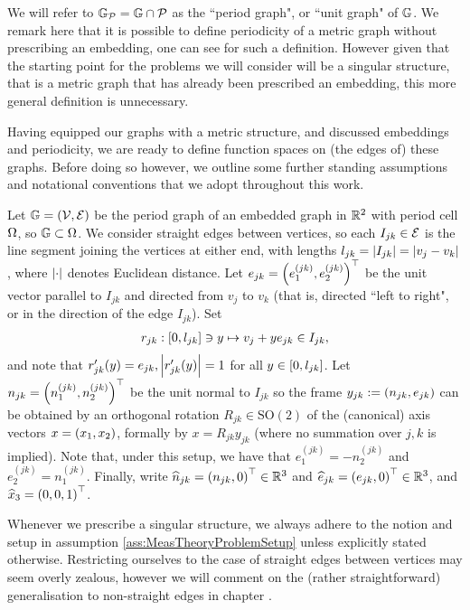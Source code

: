 We will refer to $\mathbb{G}_{\mathcal{P}} = \mathbb{G} \cap \mathcal{P}$ as the ``period graph", or ``unit graph" of $\mathbb{G}$.
We remark here that it is possible to define periodicity of a metric graph without prescribing an embedding, one can see \cite[Chapter~4]{berkolaiko2013introduction} for such a definition.
However given that the starting point for the problems we will consider will be a singular structure, that is a metric graph that has already been prescribed an embedding, this more general definition is unnecessary.

Having equipped our graphs with a metric structure, and discussed embeddings and periodicity, we are ready to define function spaces on (the edges of) these graphs.
Before doing so however, we outline some further standing assumptions and notational conventions that we adopt throughout this work.
\begin{assumption} \label{ass:MeasTheoryProblemSetup}
	Let $\mathbb{G}=\left( \mathcal{V},\mathcal{E} \right)$ be the period graph of an embedded graph in $\mathbb{R}^2$ with period cell $\Omega$, so $\mathbb{G}\subset\Omega$.
	We consider straight edges between vertices, so each $I_{jk}\in \mathcal{E}$ is the line segment joining the vertices at either end, with lengths $l_{jk} = \left\lvert I_{jk} \right\rvert = \left\lvert v_j-v_k \right\rvert$, where $\left\lvert \cdot \right\rvert$ denotes Euclidean distance.
	Let $e_{jk} = \left( e_1^{(jk)}, e_2^{(jk)} \right)^\top$ be the unit vector parallel to $I_{jk}$ and directed from $v_j$ to $v_k$ (that is, directed ``left to right", or in the direction of the edge $I_{jk}$).
	Set
	\begin{align} \label{eq:EdgeParameterisation}
		r_{jk}:\left[ 0, l_{jk} \right] \ni y \mapsto v_j + ye_{jk} \in I_{jk},
	\end{align}
	and note that $r_{jk}'(y) = e_{jk}, \left\lvert r_{jk}'(y) \right\rvert=1$ for all $y\in\left[ 0, l_{jk} \right]$.
	Let $n_{jk} = \left( n_1^{(jk)}, n_2^{(jk)} \right)^\top$ be the unit normal to $I_{jk}$ so the frame $y_{jk} := \left( n_{jk}, e_{jk} \right)$ can be obtained by an orthogonal rotation $R_{jk}\in\mathrm{SO}(2)$ of the (canonical) axis vectors $x = \left( x_1, x_2 \right)$, formally by $x = R_{jk}y_{jk}$ (where no summation over $j,k$ is implied).
	Note that, under this setup, we have that $e_1^{(jk)} = - n_2^{(jk)}$ and $e_2^{(jk)} = n_1^{(jk)}$.
	Finally, write $\widehat{n}_{jk} = \left(  n_{jk}, 0  \right)^\top\in\mathbb{R}^3$ and $\widehat{e}_{jk} = \left(  e_{jk}, 0  \right)^\top\in\mathbb{R}^3$, and $\widehat{x}_3 = \left( 0,0,1 \right)^\top$.
\end{assumption}
Whenever we prescribe a singular structure, we always adhere to the notion and setup in assumption \ref{ass:MeasTheoryProblemSetup} unless explicitly stated otherwise.
Restricting ourselves to the case of straight edges between vertices may seem overly zealous, however we will comment on the (rather straightforward) generalisation to non-straight edges in chapter .


